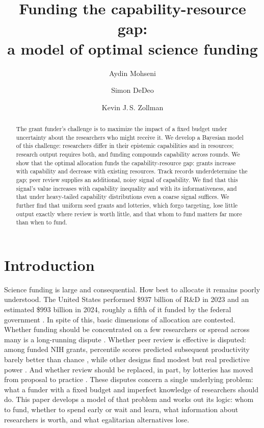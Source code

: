 \documentclass[article, 11pt, reqno]{amsart}
\title[Funding the capability-resource gap]{Funding the capability-resource gap:\\ a model of optimal science funding}
\author{Aydin Mohseni}
\author{Simon DeDeo}
\author{Kevin J.\,S. Zollman}
\theoremstyle{named}
\begin{document}
\begin{abstract}
The grant funder's challenge is to maximize the impact of a fixed budget under uncertainty
about the researchers who might receive it. We develop a Bayesian model of this challenge:
researchers differ in their epistemic capabilities and in resources; research output
requires both, and funding compounds capability across rounds. We show that the optimal
allocation funds the capability-resource gap: grants increase with capability and decrease
with existing resources. Track records underdetermine the gap; peer review supplies
an additional, noisy signal of capability. We find that this signal's value increases with
capability inequality and with its informativeness, and that under heavy-tailed capability
distributions even a coarse signal suffices. We further find that uniform seed grants and
lotteries, which forgo targeting, lose little output exactly where review is worth little, and that
whom to fund matters far more than when to fund.
\end{abstract}

\maketitle

\section{Introduction}\label{sec:intro}

Science funding is large and consequential. How best to allocate it remains poorly
understood. The United States performed \$937 billion of R\&D in 2023 and an estimated
\$993 billion in 2024, roughly a fifth of it funded by the federal government
\citep{NCSES2026, NSB2026}. In spite of this, basic dimensions of allocation are contested. Whether
funding should be concentrated on a few researchers or spread across many is a long-running
dispute \citep{Aagaard2020}. Whether peer review is effective is disputed: among funded NIH
grants, percentile scores predicted subsequent productivity barely better than chance
\citep{Fang2016}, while other designs find modest but real predictive power
\citep{Gallo2014, LiAgha2015, ParkLeeKim2015}. %
And whether review should be replaced, in part, by lotteries has moved from proposal to
practice \citep{Roumbanis2019, Heyard2022}. %
These disputes concern a single underlying problem: what a funder with a fixed budget and
imperfect knowledge of researchers should do. This paper develops a model of that problem
and works out its logic: whom to fund, whether to spend early or wait and learn, what
information about researchers is worth, and what egalitarian alternatives lose.
\end{document}
